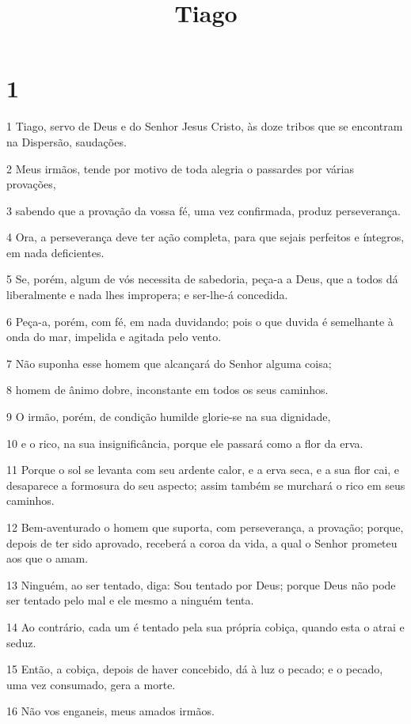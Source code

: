 

\title{Tiago}


\chapter{1}

\par 1 Tiago, servo de Deus e do Senhor Jesus Cristo, às doze tribos que se encontram na Dispersão, saudações.
\par 2 Meus irmãos, tende por motivo de toda alegria o passardes por várias provações,
\par 3 sabendo que a provação da vossa fé, uma vez confirmada, produz perseverança.
\par 4 Ora, a perseverança deve ter ação completa, para que sejais perfeitos e íntegros, em nada deficientes.
\par 5 Se, porém, algum de vós necessita de sabedoria, peça-a a Deus, que a todos dá liberalmente e nada lhes impropera; e ser-lhe-á concedida.
\par 6 Peça-a, porém, com fé, em nada duvidando; pois o que duvida é semelhante à onda do mar, impelida e agitada pelo vento.
\par 7 Não suponha esse homem que alcançará do Senhor alguma coisa;
\par 8 homem de ânimo dobre, inconstante em todos os seus caminhos.
\par 9 O irmão, porém, de condição humilde glorie-se na sua dignidade,
\par 10 e o rico, na sua insignificância, porque ele passará como a flor da erva.
\par 11 Porque o sol se levanta com seu ardente calor, e a erva seca, e a sua flor cai, e desaparece a formosura do seu aspecto; assim também se murchará o rico em seus caminhos.
\par 12 Bem-aventurado o homem que suporta, com perseverança, a provação; porque, depois de ter sido aprovado, receberá a coroa da vida, a qual o Senhor prometeu aos que o amam.
\par 13 Ninguém, ao ser tentado, diga: Sou tentado por Deus; porque Deus não pode ser tentado pelo mal e ele mesmo a ninguém tenta.
\par 14 Ao contrário, cada um é tentado pela sua própria cobiça, quando esta o atrai e seduz.
\par 15 Então, a cobiça, depois de haver concebido, dá à luz o pecado; e o pecado, uma vez consumado, gera a morte.
\par 16 Não vos enganeis, meus amados irmãos.
